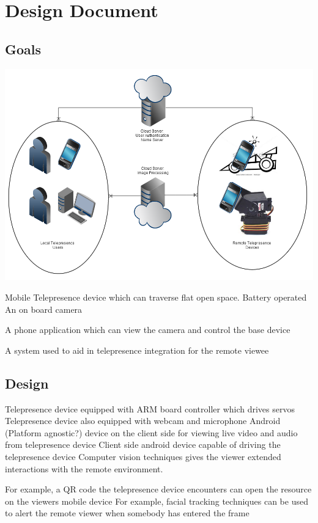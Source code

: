 \documentclass[a4paper,12pt]{report}
\begin{document}
\chapter{Design Document}

\section{Goals}
\includegraphics{networkProfile_Labeled}

Mobile Telepresence device which can traverse flat open space.
Battery operated
An on board camera

A phone application which can view the camera and control the base device

A system used to aid in telepresence integration for the remote viewee

\section{Design}
Telepresence device equipped with ARM board controller which drives servos
Telepresence device also equipped with webcam and microphone
Android (Platform agnostic?) device on the client side for viewing live video and audio from telepresence device
Client side android device capable of driving the telepresence device
Computer vision techniques gives the viewer extended interactions with the remote environment. 

For example, a QR code the telepresence device encounters can open the resource on the viewers mobile device
For example, facial tracking techniques can be used to alert the remote viewer when somebody has entered the frame
\end{document}
